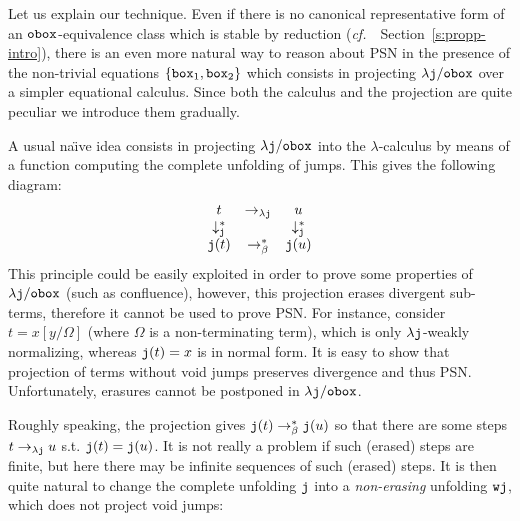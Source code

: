 \documentclass{LMCS}
\newcommand{\cf}{{\it  cf.}~}
\renewcommand{\>}{\rightarrow}
\def\lam{\lambda}
\newcommand{\Rew}[1]{\rightarrow_{#1}}
\newcommand{\Rewn}[2][*]{\rightarrow^{#1}_{#2}}
\newcommand{\dis}{{\tt j}}
\newcommand{\ldis}{\lam{\dis}}
\newcommand{\Gc}{{\tt w}}
\newcommand{\set}[1]{ \{ #1 \}}
\newcommand{\fc}{\dis}
\newcommand{\wfc}{\Gc\dis}
\newcommand{\jop}{{\tt j}}
\newcommand{\modulo}[2]{#1/#2}
\newcommand{\ldisf}{\lam \modulo{\dis}{\fsymb}}
\newcommand{\fsymb}{\osymb\boite}
\newcommand{\osymb}{{\tt o}}
\newcommand{\boite}{{\tt box}}
\newcommand{\sigt}{\boite_1}
\newcommand{\sigq}{\boite_2}
\begin{document}
Let us explain our technique. Even if there is no canonical representative form of an
$\fsymb$-equivalence class which is stable by reduction
(\cf\ Section~\ref{s:propp-intro}), there is an even more natural way
to reason about PSN in the presence of the non-trivial 
equations
$\set{\sigt,\sigq}$ which consists in projecting
$\ldisf$ over a simpler equational calculus. Since both the calculus
and the projection are quite peculiar we introduce them
gradually.\medskip

A usual na\"{\i}ve idea consists in projecting $\ldisf$ 
into the $\lam$-calculus by means of a function computing the complete
unfolding of jumps. This gives the following diagram:
\begin{equation}
\begin{array}{ccccc}
t&\Rew{\ldis}&u\\
\downarrow^*_{\jop}&&\downarrow^*_{\jop}\\
\fc(t)&\Rewn{\beta}&\fc(u)
\end{array}
\label{eq:naive-proj}
\end{equation}
This principle could be easily exploited in order to prove some
properties of $\ldisf$ (such as confluence), however, this projection
erases divergent sub-terms, therefore it cannot be used to prove
PSN. For instance, consider $t=x[y/\Omega]$
(where $\Omega$ is a non-terminating term), which is only
$\ldis$-weakly normalizing, whereas $\fc(t)=x$ is in normal form. It
is easy to show that projection of terms without void jumps preserves
divergence and thus PSN.  Unfortunately, erasures cannot be postponed
in $\ldisf$.\medskip

Roughly speaking, the projection gives $\fc(t)\Rewn{\beta}\fc(u)$ so
that there are some steps $t\Rew{\ldis} u$ s.t. $\fc(t)=\fc(u)$.  It
is not really a problem if such (erased) steps are finite, but here
there may be infinite sequences of such (erased) steps. It is then quite natural to
change the complete unfolding $\fc$ into a \textit{non-erasing}
unfolding $\wfc$, which does not project void jumps:
\end{document}
